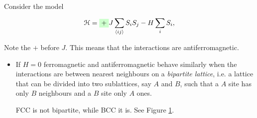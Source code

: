 \documentclass[../main/main.tex]{subfiles}
\begin{document}
\begin{example}
Consider the model
\begin{equation}
  \mathcal{H} = \mathcolorbox{green!20}{+} J \sum_{\expval{ij} }^{} S_i S_j - H \sum_{i}^{} S_i,
\end{equation}
\begin{remark}
Note the \( + \) before \( J \). This means that the interactions are antiferromagnetic.
\end{remark}
\begin{itemize}
\item  If \( H=0 \) ferromagnetic and antiferromagnetic behave similarly when the interactions are between nearest neighbours on a \emph{bipartite lattice}, i.e. a lattice that can be divided into two sublattices, say \( A \) and \( B \), such that a \( A \) site has only \( B \) neighbours and a \( B \) site only \( A \) ones.
\begin{remark}
FCC is not bipartite, while BCC it is. See Figure \ref{fig:13_1}.
\end{remark}

\begin{figure}[h!]
\begin{minipage}[c]{0.5\linewidth}
\end{minipage}
\begin{minipage}[]{0.5\linewidth}
\centering
{}
\end{minipage}
\caption{\label{fig:13_1} }
\end{figure}


\end{itemize}
\end{example}
\end{document}
